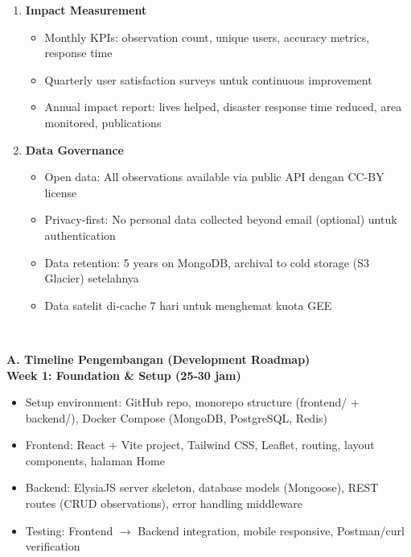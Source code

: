 \documentclass[12pt,a4paper]{article}
\newcommand{\sectionbox}[1]{%
  \colorbox{samsungblue}{%
    \parbox{\textwidth}{%
      \textcolor{white}{\large\bfseries #1}%
    }%
  }%
}
\newcommand{\subsectionbox}[1]{%
  \textbf{\large #1}\\[0.3cm]
}
\begin{document}
\begin{enumerate}
  \item \textbf{Impact Measurement}
  \begin{itemize}
    \item Monthly KPIs: observation count, unique users, accuracy metrics, response time
    \item Quarterly user satisfaction surveys untuk continuous improvement
    \item Annual impact report: lives helped, disaster response time reduced, area monitored, publications
  \end{itemize}

  \item \textbf{Data Governance}
  \begin{itemize}
    \item Open data: All observations available via public API dengan CC-BY license
    \item Privacy-first: No personal data collected beyond email (optional) untuk authentication
    \item Data retention: 5 years on MongoDB, archival to cold storage (S3 Glacier) setelahnya
    \item Data satelit di-cache 7 hari untuk menghemat kuota GEE
  \end{itemize}
\end{enumerate}

\vspace{1cm}

\newpage

\sectionbox{INFORMASI TAMBAHAN}

\vspace{0.5cm}

\subsectionbox{A. Timeline Pengembangan (Development Roadmap)}

\textbf{Week 1: Foundation \& Setup (25-30 jam)}
\begin{itemize}
  \item Setup environment: GitHub repo, monorepo structure (frontend/ + backend/), Docker Compose (MongoDB, PostgreSQL, Redis)
  \item Frontend: React + Vite project, Tailwind CSS, Leaflet, routing, layout components, halaman Home
  \item Backend: ElysiaJS server skeleton, database models (Mongoose), REST routes (CRUD observations), error handling middleware
  \item Testing: Frontend $\rightarrow$ Backend integration, mobile responsive, Postman/curl verification
\end{itemize}
\end{document}
